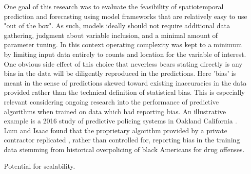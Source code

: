 One goal of this research was to evaluate the feasibility of spatiotemporal prediction and forecasting using model frameworks that are relatively easy to use "out of the box". As such, models ideally should not require additional data gathering, judgment about variable inclusion, and a minimal amount of parameter tuning. In this context operating complexity was kept to a minimum by limiting input data entirely to counts and location for the variable of interest.  One obvious side effect of this choice that neverless bears stating directly is any bias in the data will be diligently reproduced in the predictions. Here 'bias' is meant in the sense of predictions skewed toward existing inaccuracies in the data provided rather than the technical definition of statistical bias. This is especially relevant considering ongoing research into the performance of predictive algorithms when trained on data which had reporting bias. An illustrative example is a 2016 study of predictive policing systems in Oakland California \cite{lum2016predict}. Lum and Isaac found that the proprietary algorithm provided by a private contractor replicated , rather than controlled for, reporting bias in the training data stemming from historical overpolicing of black Americans for drug offenses. \par



Potential for scalability.
